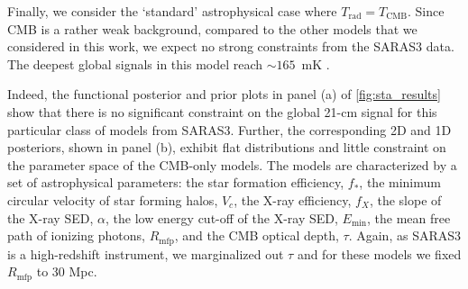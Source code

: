 Finally, we consider the `standard' astrophysical case where $T_\mathrm{rad} = T_\mathrm{CMB}$. Since CMB is a rather weak background, compared to the other models that we considered in this work, we expect no strong constraints from the SARAS3 data. The deepest global signals in this model reach $\sim 165$~mK \cite{Reis_sta_2021}.  

Indeed, the functional posterior and prior plots in panel (a) of \cref{fig:sta_results} show that there is no significant constraint on the global 21-cm signal for this particular class of models from SARAS3. Further, the corresponding 2D and 1D posteriors, shown in panel (b), exhibit flat distributions and little constraint on the parameter space of the CMB-only models. The models are characterized by a set of astrophysical parameters: the star formation efficiency, $f_*$, the minimum circular velocity of star forming halos, $V_c$, the X-ray efficiency, $f_X$, the slope of the X-ray SED, $\alpha$, the low energy cut-off of the X-ray SED, $E_\mathrm{min}$, the mean free path of ionizing photons, $R_\mathrm{mfp}$, and the CMB optical depth, $\tau$. Again, as SARAS3 is a high-redshift instrument, we marginalized out $\tau$ and for these models we fixed $R_\mathrm{mfp}$ to 30 Mpc.


